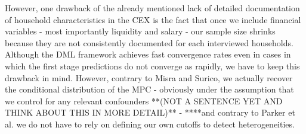 However, one drawback of the already mentioned lack of detailed documentation of household characteristics in the CEX is the fact that once we include financial variables - most importantly liquidity and salary - our sample size shrinks because they are not consistently documented for each interviewed households. Although the DML framework achieves fast convergence rates even in cases in which the first stage predictions do not converge as rapidly, we have to keep this drawback in mind. However, contrary to Misra and Surico, we actually recover the conditional distribution of the MPC - obviously under the assumption that we control for any relevant confounders **(NOT A SENTENCE YET AND THINK ABOUT THIS IN MORE DETAIL)** - ****and contrary to Parker et al. we do not have to rely on defining our own cutoffs to detect heterogeneities. 

